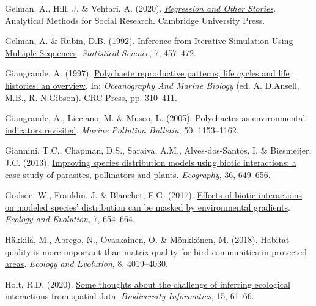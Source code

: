\documentclass[9pt,biorxiv,doublespacing,lineno]{lapreprint}
\newlength{\cslhangindent}
\newlength{\cslentryspacingunit} %
\newenvironment{CSLReferences}[2] %
 {%
  \setlength{\parindent}{0pt}
  \ifodd #1
  \let\oldpar\par
  \def\par{\hangindent=\cslhangindent\oldpar}
  \fi
  \setlength{\parskip}{#2\cslentryspacingunit}
 }%
 {}
\begin{document}
\begin{CSLReferences}{1}{0}
\leavevmode{}%
Gelman, A., Hill, J. \& Vehtari, A. (2020).
\emph{\href{https://doi.org/10.1017/9781139161879}{Regression and Other
Stories}}. Analytical Methods for Social Research. Cambridge University
Press.

\leavevmode{}%
Gelman, A. \& Rubin, D.B. (1992).
\href{https://doi.org/10.1214/ss/1177011136}{Inference from Iterative
Simulation Using Multiple Sequences}. \emph{Statistical Science}, 7,
457--472.

\leavevmode{}%
Giangrande, A. (1997).
\href{https://doi.org/10.1201/b12590-8}{Polychaete reproductive
patterns, life cycles and life histories: an overview}. In:
\emph{Oceanography And Marine Biology} (ed. A. D.Ansell, M.B., R.
N.Gibson). CRC Press, pp. 310--411.

\leavevmode{}%
Giangrande, A., Licciano, M. \& Musco, L. (2005).
\href{https://doi.org/10.1016/j.marpolbul.2005.08.003}{Polychaetes as
environmental indicators revisited}. \emph{Marine Pollution Bulletin},
50, 1153--1162.

\leavevmode{}%
Giannini, T.C., Chapman, D.S., Saraiva, A.M., Alves-dos-Santos, I. \&
Biesmeijer, J.C. (2013).
\href{https://doi.org/10.1111/j.1600-0587.2012.07191.x}{Improving
species distribution models using biotic interactions: a case study of
parasites, pollinators and plants}. \emph{Ecography}, 36, 649--656.

\leavevmode{}%
Godsoe, W., Franklin, J. \& Blanchet, F.G. (2017).
\href{https://doi.org/10.1002/ece3.2657}{Effects of biotic interactions
on modeled species' distribution can be masked by environmental
gradients}. \emph{Ecology and Evolution}, 7, 654--664.

\leavevmode{}%
Häkkilä, M., Abrego, N., Ovaskainen, O. \& Mönkkönen, M. (2018).
\href{https://doi.org/10.1002/ece3.3923}{Habitat quality is more
important than matrix quality for bird communities in protected areas}.
\emph{Ecology and Evolution}, 8, 4019--4030.

\leavevmode{}%
Holt, R.D. (2020). \href{https://doi.org/10.17161/bi.v15i1.13302}{Some
thoughts about the challenge of inferring ecological interactions from
spatial data.} \emph{Biodiversity Informatics}, 15, 61--66.


\end{CSLReferences}
\end{document}
